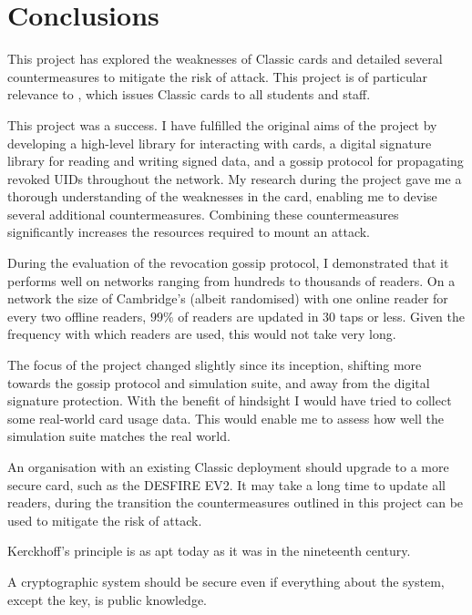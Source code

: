 \documentclass[dissertation.tex]{subfiles}
\begin{document}
  \chapter{Conclusions}

  This project has explored the weaknesses of \mifare{} Classic cards and detailed several countermeasures to mitigate the risk of attack. This project is of particular relevance to \UoC{}, which issues \mifare{} Classic cards to all students and staff.

  This project was a success. I have fulfilled the original aims of the project by developing a high-level \mifare{} library for interacting with \mifare{} cards, a \mifare{} digital signature library for reading and writing signed data, and a gossip protocol for propagating revoked UIDs throughout the network. My research during the project gave me a thorough understanding of the weaknesses in the card, enabling me to devise several additional countermeasures. Combining these countermeasures significantly increases the resources required to mount an attack.

  During the evaluation of the revocation gossip protocol, I demonstrated that it performs well on networks ranging from hundreds to thousands of readers. On a network the size of Cambridge's (albeit randomised) with one online reader for every two offline readers, $99\%$ of readers are updated in 30 taps or less. Given the frequency with which readers are used, this would not take very long.

  The focus of the project changed slightly since its inception, shifting more towards the gossip protocol and simulation suite, and away from the digital signature protection. With the benefit of hindsight I would have tried to collect some real-world card usage data. This would enable me to assess how well the simulation suite matches the real world.

  An organisation with an existing \mifare{} Classic deployment should upgrade to a more secure card, such as the \mifare{} DESFIRE EV2. It may take a long time to update all readers, during the transition the countermeasures outlined in this project can be used to mitigate the risk of attack.

  Kerckhoff's principle is as apt today as it was in the nineteenth century.
  \begin{displayquote}
    A cryptographic system should be secure even if everything about the system, except the key, is public knowledge.
  \end{displayquote}
\end{document}
